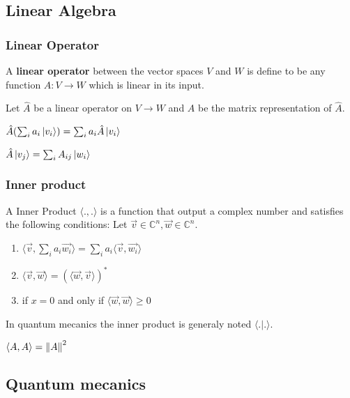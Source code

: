 \documentclass[5pt]{article}
\begin{document}
\begin{multicols}{3}
\subsection{Linear Algebra}

\subsubsection{Linear Operator}
A \textbf{linear operator} between the vector spaces $V$ and $W$ is define to be any function $A:V\rightarrow W$ which is linear in its input.
\begin{properties}
     Let $\hat{A}$ be a linear operator on $V\rightarrow W$  and $A$ be the matrix representation of $\hat{A}$.
     \begin{itemize*}
          \item $\hat{A}(\sum_ia_i\ket{v_i})=\sum_ia_i\hat{A}\ket{v_i}$\\
          \item $\hat{A}\ket{v_j}=\sum_iA_{ij}\ket{w_i}$\\
     \end{itemize*}
\end{properties}


\subsubsection{Inner product}
A Inner Product $\langle.,.\rangle$ is a function that output a complex number and satisfies the following conditions: Let $\vec{v}\in\mathbb{C}^n, \vec{w}\in\mathbb{C}^n$.
\begin{enumerate}
     \item $\langle \vec{v},\sum_ia_i\vec{w_i}\rangle=\sum_ia_i\langle \vec{v},\vec{w_i}\rangle$
     \item $\langle \vec{v},\vec{w}\rangle=(\langle \vec{w},\vec{v}\rangle)^*$
     \item if $x=0$ and only if $\langle \vec{w},\vec{w}\rangle\geq 0$
\end{enumerate}
In quantum mecanics the inner product is generaly noted $\langle.|.\rangle$.


\begin{properties}
     $\langle A,A\rangle=\norm{A}^2$\\
\end{properties}




\subsection{Quantum mecanics}

\end{multicols}
\end{document}
